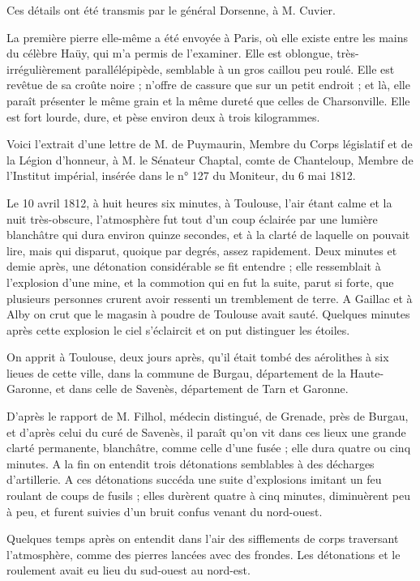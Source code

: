 \documentclass[a4paper, 12pt, oneside, french]{article}
\begin{document}
Ces détails ont été transmis par le général Dorsenne, à M. Cuvier.

La première pierre elle-même a été envoyée à Paris, où elle existe entre les mains du célèbre Haüy, qui m'a permis de l'examiner. Elle est oblongue, très-irrégulièrement parallélépipède, semblable à un gros caillou peu roulé. Elle est revêtue de sa croûte noire ; n'offre de cassure que sur un petit endroit ; et là, elle paraît présenter le même grain et la même dureté que celles de Charsonville. Elle est fort lourde, dure, et pèse environ deux à trois kilogrammes.

Voici l'extrait d'une lettre de M. de Puymaurin, Membre du Corps législatif et de la Légion d'honneur, à M. le Sénateur Chaptal, comte de Chanteloup, Membre de l'Institut impérial, insérée dans le n° 127 du Moniteur, du 6 mai 1812.

\og Le 10 avril 1812, à huit heures six minutes, à Toulouse, l'air étant calme et la nuit très-obscure, l'atmosphère fut tout d'un coup éclairée par une lumière blanchâtre qui dura environ quinze secondes, et à la clarté de laquelle on pouvait lire, mais qui disparut, quoique par degrés, assez rapidement. Deux minutes et demie après, une détonation considérable se fit entendre ; elle ressemblait à l'explosion d'une mine, et la commotion qui en fut la suite, parut si forte, que plusieurs personnes crurent avoir ressenti un tremblement de terre. A Gaillac et à Alby on crut que le magasin à poudre de Toulouse avait sauté. Quelques minutes après cette explosion le ciel s'éclaircit et on put distinguer les étoiles. \fg

\og On apprit à Toulouse, deux jours après, qu'il était tombé des aérolithes à six lieues de cette ville, dans la commune de Burgau, département de la Haute-Garonne, et dans celle de Savenès, département de Tarn et Garonne. \fg

\og D'après le rapport de M. Filhol, médecin distingué, de Grenade, près de Burgau, et d'après celui du curé de Savenès, il paraît qu'on vit dans ces lieux une grande clarté permanente, blanchâtre, comme celle d'une fusée ; elle dura quatre ou cinq minutes. A la fin on entendit trois détonations semblables à des décharges d'artillerie. A ces détonations succéda une suite d'explosions imitant un feu roulant de coups de fusils ; elles durèrent quatre à cinq minutes, diminuèrent peu à peu, et furent suivies d'un bruit confus venant du nord-ouest. \fg

\og Quelques temps après on entendit dans l'air des sifflements de corps traversant l'atmosphère, comme des pierres lancées avec des frondes. Les détonations et le roulement avait eu lieu du sud-ouest au nord-est. \fg
\end{document}
